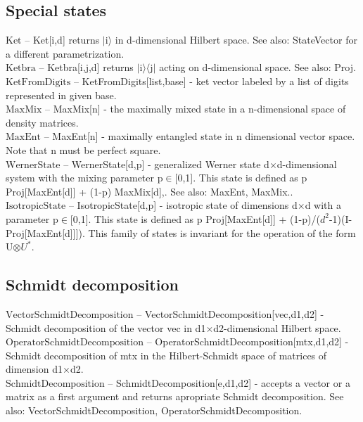 \subsection{Special states}

\noindent\textbf{$ \text{Ket} $ }-- Ket[i,d] returns $|$i$\rangle $ in d-dimensional Hilbert space. See also: StateVector for a different parametrization.$  $\\
\noindent\textbf{$ \text{Ketbra} $ }-- Ketbra[i,j,d] returns $|$i$\rangle \langle $j$|$ acting on d-dimensional space. See also: Proj.$  $\\
\noindent\textbf{$ \text{KetFromDigits} $ }-- KetFromDigits[list,base] - ket vector labeled by a list of digits represented in given base.$  $\\
\noindent\textbf{$ \text{MaxMix} $ }-- MaxMix[n] - the maximally mixed state in a n-dimensional space of density matrices.$  $\\
\noindent\textbf{$ \text{MaxEnt} $ }-- MaxEnt[n] - maximally entangled state in n dimensional vector space. Note that n must be perfect square.$  $\\
\noindent\textbf{$ \text{WernerState} $ }-- WernerState[d,p] - generalized Werner state d$\times $d-dimensional system with the mixing parameter p$\in $[0,1]. This state is defined as p Proj[MaxEnt[d]] + (1-p) MaxMix[d],. See also: MaxEnt, MaxMix..$  $\\
\noindent\textbf{$ \text{IsotropicState} $ }-- IsotropicState[d,p] - isotropic state of dimensions d$\times $d with a parameter p$\in $[0,1]. This state is defined as p Proj[MaxEnt[d]] + (1-p)/($ d^2 $-1)(I-Proj[MaxEnt[d]]]). This family of states is invariant for the operation of the form U$\otimes $$ U^*. $\\
\subsection{Schmidt decomposition}

\noindent\textbf{$ \text{VectorSchmidtDecomposition} $ }-- VectorSchmidtDecomposition[vec,d1,d2] - Schmidt decomposition of the vector vec in d1$\times $d2-dimensional Hilbert space.$  $\\
\noindent\textbf{$ \text{OperatorSchmidtDecomposition} $ }-- OperatorSchmidtDecomposition[mtx,d1,d2] - Schmidt decomposition of mtx in the Hilbert-Schmidt space of matrices of dimension d1$\times $d2.$  $\\
\noindent\textbf{$ \text{SchmidtDecomposition} $ }-- SchmidtDecomposition[e,d1,d2] - accepts a vector or a matrix as a first argument and returns apropriate Schmidt decomposition. See also: VectorSchmidtDecomposition, OperatorSchmidtDecomposition.$  $\\
